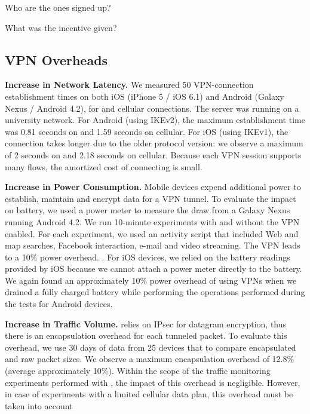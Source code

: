 Who are the ones signed up?

What was the incentive given?

\subsection{VPN Overheads}


\noindent\textbf{Increase in Network Latency.}
We measured 50 VPN-connection establishment times  on both iOS (iPhone 5 / iOS 6.1) and Android (Galaxy Nexus /
Android 4.2), for \wifi{} and cellular connections. 
The \meddle server was running on a university network. 
For Android (using IKEv2), the maximum establishment time was 0.81 seconds on \wifi{} and 1.59 seconds on cellular. 
For iOS (using IKEv1), the connection takes longer due to the older protocol version: we observe a maximum of 2 seconds on \wifi{} and 2.18 seconds on cellular. 
Because each VPN session supports many flows, the amortized cost of connecting is  small. 

\noindent\textbf{Increase in Power Consumption.}
Mobile devices expend additional power to establish, maintain and encrypt data for a VPN tunnel. 
To evaluate the impact on battery, we used a power meter to measure the draw from a Galaxy Nexus running Android 4.2. 
We run 10-minute experiments with and without the VPN enabled. 
For each experiment, we used an activity script that included Web and map searches, Facebook interaction, e-mail and video
streaming. 
The VPN leads to a 10\% power overhead. . 
For iOS devices, we relied on the battery readings provided by iOS because we cannot attach a power meter directly to the battery.
We again found an approximately 10\% power overhead of using VPNs when we drained a fully charged battery while performing the operations performed during the tests for Android devices.  

\noindent\textbf{Increase in Traffic Volume.}
\meddle relies on IPsec for datagram encryption, thus there is an encapsulation overhead for each tunneled packet. 
To evaluate this overhead, we use 30 days of data from 25 devices that to compare encapsulated and raw packet sizes. 
We observe a maximum encapsulation overhead of 12.8\% (average approximately 10\%). 
Within the scope of the traffic monitoring experiments performed with \meddle, the impact of this overhead is negligible. 
However, in case of experiments with a limited cellular data plan, this overhead must be taken into account

